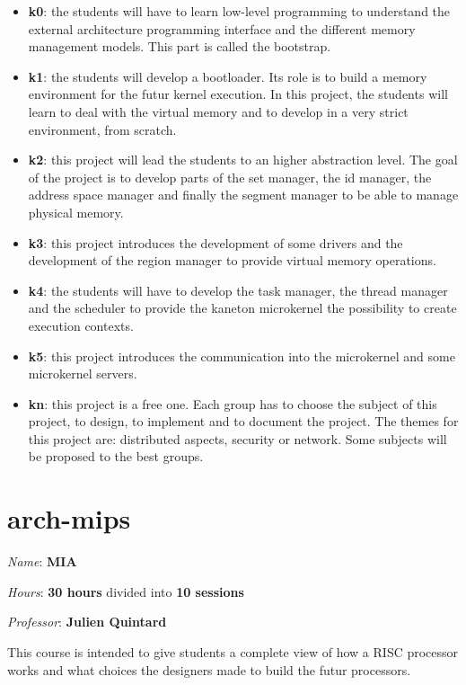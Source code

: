 \begin{multicols}{2}
\begin{itemize}
  \item
    \textbf{k0}: the students will have to learn low-level programming to
    understand the external architecture programming interface and the
    different memory management models. This part is called the bootstrap.
  \item
    \textbf{k1}: the students will develop a bootloader. Its role is to
    build a memory environment for the futur kernel execution. In this
    project, the students will learn to deal with the virtual memory
    and to develop in a very strict environment, from scratch.
  \item
    \textbf{k2}: this project will lead the students to an higher abstraction
    level. The goal of the project is to develop parts of the set manager,
    the id manager, the address space manager and finally the segment
    manager to be able to manage physical memory.
  \item
    \textbf{k3}: this project introduces the development of some drivers
    and the development of the region manager to provide virtual memory
    operations.
  \item
    \textbf{k4}: the students will have to develop the task manager, the
    thread manager and the scheduler to provide the kaneton microkernel
    the possibility to create execution contexts.
  \item
    \textbf{k5}: this project introduces the communication into the
    microkernel and some microkernel servers.
  \item
    \textbf{kn}: this project is a free one. Each group has to choose the
    subject of this project, to design, to implement and to document
    the project. The themes for this project are: distributed aspects,
    security or network. Some subjects will be proposed to the best groups.
\end{itemize}



%
%

\section{arch-mips}

\textit{Name}: \textbf{MIA}

\textit{Hours}: \textbf{30 hours} divided into \textbf{10 sessions}

\textit{Professor}: \textbf{Julien Quintard}

This course is intended to give students a complete view of how a RISC
processor works and what choices the designers made to build the futur
processors.


\end{multicols}
